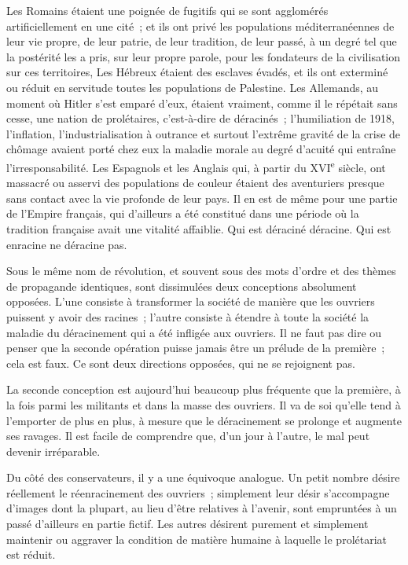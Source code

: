 \documentclass[french,twoside]{book} %
\begin{document}
Les Romains étaient une poignée de fugitifs qui se sont agglomérés artificiellement en une cité ; et ils ont privé les populations méditerranéennes de leur vie propre, de leur patrie, de leur tradition, de leur passé, à un degré tel que la postérité les a pris, sur leur propre parole, pour les fondateurs de la civilisation sur ces territoires, Les Hébreux étaient des esclaves évadés, et ils ont exterminé ou réduit en servitude toutes les populations de Palestine. Les Allemands, au moment où Hitler s'est emparé d'eux, étaient vraiment, comme il le répétait sans cesse, une nation de prolétaires, c'est-à-dire de déracinés ; l'humiliation de 1918, l'inflation, l'industrialisation à outrance et surtout l'extrême gravité de la crise de chômage avaient porté chez eux la maladie morale au degré d'acuité qui entraîne l'irresponsabilité. Les Espagnols et les Anglais qui, à partir du XVI\textsuperscript{e} siècle, ont massacré ou asservi des populations de couleur étaient des aventuriers presque sans contact avec la vie profonde de leur pays. Il en est de même pour une partie de l'Empire français, qui d'ailleurs a été constitué dans une période où la tradition française avait une vitalité affaiblie. Qui est déraciné déracine. Qui est enracine ne déracine pas.\par
Sous le même nom de révolution, et souvent sous des mots d'ordre et des thèmes de propagande identiques, sont dissimulées deux conceptions absolument opposées. L'une consiste à transformer la société de manière que les ouvriers puissent y avoir des racines ; l'autre consiste à étendre à toute la société la maladie du déracinement qui a été infligée aux ouvriers. Il ne faut pas dire ou penser que la seconde opération puisse jamais être un prélude de la première ; cela est faux. Ce sont deux directions opposées, qui ne se rejoignent pas.\par
La seconde conception est aujourd'hui beaucoup plus fréquente que la première, à la fois parmi les militants et dans la masse des ouvriers. Il va de soi qu'elle tend à l'emporter de plus en plus, à mesure que le déracinement se prolonge et augmente ses ravages. Il est facile de comprendre que, d'un jour à l'autre, le mal peut devenir irréparable.\par
Du côté des conservateurs, il y a une équivoque analogue. Un petit nombre désire réellement le réenracinement des ouvriers ; simplement leur désir s'accompagne d'images dont la plupart, au lieu d'être relatives à l'avenir, sont empruntées à un passé d'ailleurs en partie fictif. Les autres désirent purement et simplement maintenir ou aggraver la condition de matière humaine à laquelle le prolétariat est réduit.\par
\end{document}
